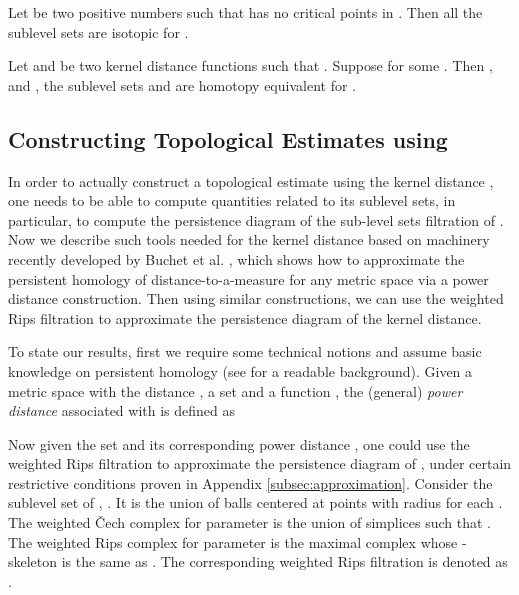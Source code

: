 \documentclass[11pt]{myclass}
\begin{document}
\begin{theorem}
Let  be two positive numbers such that  has no critical points in .  
Then all the sublevel sets  are isotopic for . 
\end{theorem}

\begin{theorem}[Reconstruction on ]
Let  and  be two kernel distance functions such that
.  
Suppose  for some .
Then , and , 
the sublevel sets  and  are homotopy equivalent for . 
\label{thm:reconstruct}
\end{theorem}










\subsection{Constructing Topological Estimates using }
\label{subsec:topo-est}
In order to actually construct a topological estimate using the kernel distance , one needs to be able to compute quantities related to its sublevel sets, in particular, to compute the persistence diagram of the sub-level sets filtration of .  
Now we describe such tools needed for the kernel distance based on machinery recently developed by Buchet et al.  \cite{BuchetChazalOudot2013}, which shows how to approximate the persistent homology of distance-to-a-measure for any metric space via a power distance construction. Then using similar constructions, we can use the weighted Rips filtration to approximate the persistence diagram of the kernel distance. 

To state our results, first we require some technical notions and assume basic knowledge on persistent homology (see \cite{EdelsbrunnerHarer2008,EdelsbrunnerHarer2010} for a readable background). 
Given a metric space  with the distance , a set  and a function , the (general) \emph{power distance}  associated with  is defined as 
 
Now given the set  and its corresponding power distance , one could use the weighted Rips filtration to approximate the persistence diagram of , under certain restrictive conditions proven in Appendix \ref{subsec:approximation}.  
Consider the sublevel set of , . It is the union of balls centered at points  with radius  for each .
The weighted \v{C}ech complex  for parameter  is the union of simplices  such that . 
The weighted Rips complex  for parameter  is the maximal complex whose -skeleton is the same as .  
The corresponding weighted Rips filtration is denoted as . 
\end{document}
